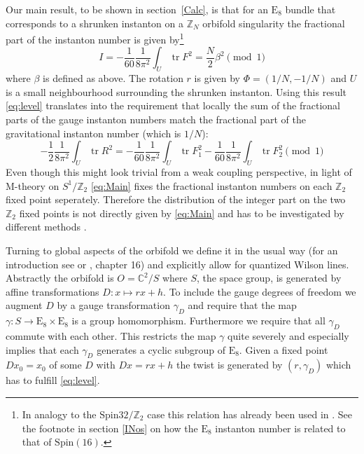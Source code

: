 \documentclass[a4paper,12pt,twoside]{article}
\numberwithin{equation}{section}
\newcommand{\Spin}{\text{Spin}} %
\newcommand{\pE}{\text{E}  }     %
\newcommand{\mC}{\mathbb{C}}
\newcommand{\mZ}{\mathbb{Z}}
\newcommand{\auf}{\rightarrow}
\DeclareMathOperator{\tr}{tr}
\begin{document}
Our main result, to be shown in section~\ref{Calc}, is that for an
$\pE_8$ bundle that corresponds to a shrunken instanton on a $\mZ_N$
orbifold singularity the fractional part of the instanton number is
given by\footnote{In analogy to the $\Spin{32}/\mZ_2$ case this
  relation has already been used in \cite{Aldazabal}. See the footnote
  in section \ref{INos} on how the $\pE_8$ instanton number is related
  to that of $\Spin(16)$.}
\begin{equation}
  \label{eq:Main}
  I = - \frac{1}{60} \frac{1}{8\pi^2} \int_U \tr F^2
  = \frac{N}{2} \beta^2
  \pmod 1
\end{equation}
where $\beta$ is defined as above. The rotation $r$ is given by
$\Phi=(1/N,-1/N)$ and $U$ is a small neighbourhood surrounding the
shrunken instanton. Using this result \eqref{eq:level} translates into
the requirement that locally the sum of the fractional parts of the
gauge instanton numbers match the fractional part of the gravitational
instanton number (which is $1/N$):
\begin{equation}
  \label{eq:level2}
  - \frac{1}{2} \frac{1}{8\pi^2} \int_U \tr R^2 =
  - \frac{1}{60} \frac{1}{8\pi^2} \int_U \tr F_1^2
  - \frac{1}{60} \frac{1}{8\pi^2} \int_U \tr F_2^2
  \pmod 1
\end{equation}
Even though this might look trivial from a weak coupling perspective,
in light of M-theory on $S^1/\mZ_2$ \eqref{eq:Main} fixes the
fractional instanton numbers on each $\mZ_2$ fixed point seperately.
Therefore the distribution of the integer part on the two $\mZ_2$
fixed points is not directly given by \eqref{eq:Main} and has to be
investigated by different methods \cite{Stieberger, OvrutI,
  Kaplunovsky, OvrutII}.

Turning to global aspects of the orbifold we define it in the usual
way \cite{OrbII} (for an introduction see \cite{Nilles} or \cite{Pol},
chapter 16) and explicitly allow for quantized Wilson lines.
Abstractly the orbifold is $O = \mC^2/S$ where $S$, the space group,
is generated by affine transformations $D : x \mapsto rx + h$.  To
include the gauge degrees of freedom we augment $D$ by a gauge
transformation $\gamma_D$ and require that the map $\gamma : S \auf
\pE_8 \times \pE_8$ is a group homomorphism. Furthermore we require
that all $\gamma_D$ commute with each other. This restricts the map
$\gamma$ quite severely and especially implies that each $\gamma_D$
generates a cyclic subgroup of $\pE_8$. Given a fixed point $Dx_0 =
x_0$ of some $D$ with $Dx=rx+h$ the twist is generated by $(r,
\gamma_D)$ which has to fulfill \eqref{eq:level}.
\end{document}
